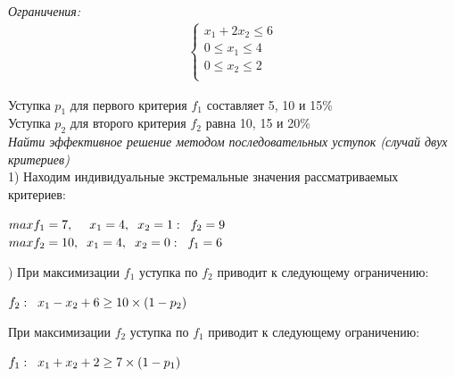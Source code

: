\documentclass[14pt,fleqn]{extarticle}
\begin{document}
	\textit{Ограничения:}
	\begin{align*}
		\begin{cases}
			x_1 + 2x_2 \leq 6\\
			0 \leq x_1 \leq 4\\
			0 \leq x_2 \leq 2\\
		\end{cases}
	\end{align*}
	
	Уступка $p_1$ для первого критерия $f_1$ составляет 5, 10 и 15\%\\
	Уступка $p_2$ для второго критерия $f_2$ равна 10, 15 и 20\%\\
	
	\textit{Найти эффективное решение методом последовательных уступок (случай двух критериев)}\\
	
	1) Находим индивидуальные экстремальные значения рассматриваемых критериев:
	\begin{center}
		$max f_1 = 7, \hspace{0.45cm} x_1 = 4, \hspace{0.2cm} x_2 = 1: \hspace{0.2cm} f_2 = 9$\\
		$max f_2 = 10, \hspace{0.2cm} x_1 = 4, \hspace{0.2cm} x_2 = 0: \hspace{0.2cm} f_1 = 6$
	\end{center}
	) При максимизации $f_1$ уступка по $f_2$ приводит к следующему ограничению:
	\begin{center}
		$f_2: \hspace{0.2cm} x_1 - x_2 + 6 \geq 10 \times (1 - p_2)$
	\end{center}
	При максимизации $f_2$ уступка по $f_1$ приводит к следующему ограничению:
	\begin{center}
		$f_1: \hspace{0.2cm} x_1 + x_2 + 2 \geq 7 \times (1 - p_1)$
	\end{center}
	
\end{document}
